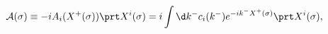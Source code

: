 \begin{equation}
{\cal A}(\sigma)
\equiv -iA_i(X^+(\sigma))\prt X^i(\sigma)=
i\int \d k^{-} c_i(k^-)
e^{-ik^-X^+(\sigma)}\prt X^i(\sigma), \label{deform op}
\end{equation}

